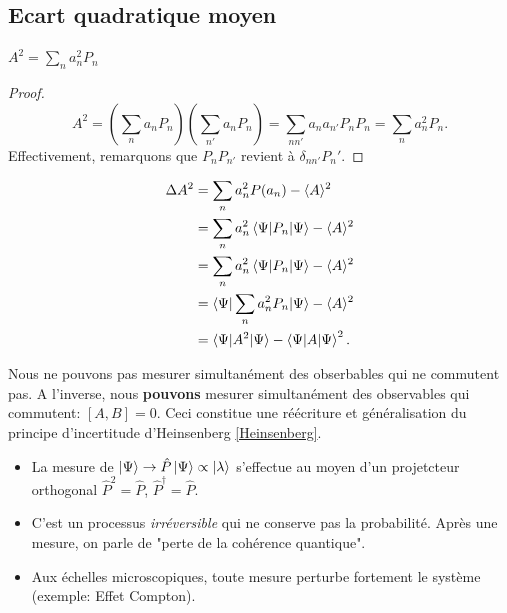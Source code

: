 \documentclass[../notesdecours.tex]{subfiles}
\begin{document}
\subsection{Ecart quadratique moyen}
\begin{lemma}
$A^2 = \sum_n a_n^2P_n$
\end{lemma}
\begin{proof}
\begin{equation*}
A^2 = (\sum_n a_nP_n)(\sum_{n'} a_nP_n) = \sum_{nn'} a_na_{n'}P_nP_{n} = \sum_n a_n^2P_n.
\end{equation*}
Effectivement, remarquons que $P_nP_{n'}$ revient à $\delta_{nn'}P_n'$.
\end{proof}
\begin{align*}
\Delta A^2 &= \sum_n a_n^2 P(a_n) - \langle A\rangle^2\\
&= \sum_n a_n^2 \braket{\Psi|P_n|\Psi} - \langle A\rangle^2\\
&= \sum_n a_n^2 \braket{\Psi|P_n|\Psi} - \langle A\rangle^2\\
&= \braket{\Psi|\sum_n a_n^2 P_n|\Psi} - \langle A\rangle^2\\
&= \braket{\Psi|A^2|\Psi} - \braket{\Psi|A|\Psi}^2.
\end{align*}

\begin{remark} Nous ne pouvons pas mesurer simultanément des obserbables qui ne commutent pas. A l'inverse, nous \textbf{pouvons} mesurer simultanément des observables qui commutent: $[A,B] = 0$. Ceci constitue une réécriture et généralisation du principe d'incertitude d'Heinsenberg \eqref{Heinsenberg}.\end{remark}

\begin{center}
\end{center}

\begin{itemize}
\item La mesure de $\ket{\Psi} \rightarrow \hat{P}\ket{\Psi} \propto \ket{\lambda}$ s'effectue au moyen d'un projetcteur orthogonal $\hat{P}^2 = \hat{P}$, $\hat{P}^\dagger = \hat{P}$.
\item C'est un processus \textit{irréversible} qui ne conserve pas la probabilité. Après une mesure, on parle de "perte de la cohérence quantique".
\item Aux échelles microscopiques, toute mesure perturbe fortement le système (exemple: Effet Compton). 
\end{itemize}
\end{document}
